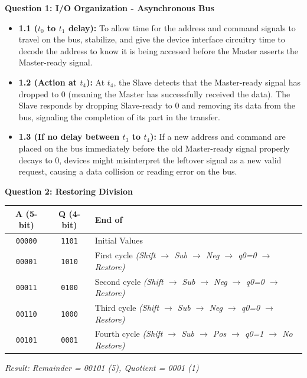\documentclass[12pt]{article}
\begin{document}
\textbf{Question 1: I/O Organization - Asynchronous Bus}
\begin{itemize}
    \item \textbf{1.1 ($t_0$ to $t_1$ delay):} To allow time for the address and command signals to travel on the bus, stabilize, and give the device interface circuitry time to decode the address to know it is being accessed before the Master asserts the Master-ready signal.
    \item \textbf{1.2 (Action at $t_4$):} At $t_4$, the Slave detects that the Master-ready signal has dropped to 0 (meaning the Master has successfully received the data). The Slave responds by dropping Slave-ready to 0 and removing its data from the bus, signaling the completion of its part in the transfer.
    \item \textbf{1.3 (If no delay between $t_3$ to $t_4$):} If a new address and command are placed on the bus immediately before the old Master-ready signal properly decays to 0, devices might misinterpret the leftover signal as a new valid request, causing a data collision or reading error on the bus.
\end{itemize}

\textbf{Question 2: Restoring Division}
\begin{center}
\begin{tabular}{|c|c|l|}
\hline
\textbf{A (5-bit)} & \textbf{Q (4-bit)} & \textbf{End of} \\
\hline
\texttt{00000} & \texttt{1101} & Initial Values \\
\hline
\texttt{00001} & \texttt{1010} & First cycle \textit{(Shift $\to$ Sub $\to$ Neg $\to$ q0=0 $\to$ Restore)} \\
\hline
\texttt{00011} & \texttt{0100} & Second cycle \textit{(Shift $\to$ Sub $\to$ Neg $\to$ q0=0 $\to$ Restore)} \\
\hline
\texttt{00110} & \texttt{1000} & Third cycle \textit{(Shift $\to$ Sub $\to$ Neg $\to$ q0=0 $\to$ Restore)} \\
\hline
\texttt{00101} & \texttt{0001} & Fourth cycle \textit{(Shift $\to$ Sub $\to$ Pos $\to$ q0=1 $\to$ No Restore)} \\
\hline
\end{tabular}
\end{center}
\textit{Result: Remainder = 00101 (5), Quotient = 0001 (1)}
\end{document}
